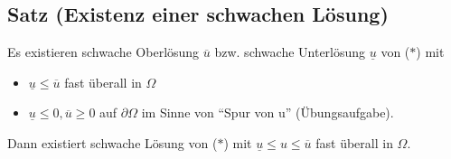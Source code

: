 \subsection{Satz (Existenz einer schwachen Lösung)}

Es existieren schwache Oberlösung $\overline u$ bzw. schwache Unterlösung $\underline u$ von ($\ast$) mit
\begin{itemize}
  \item $\underline u \leq \overline u$ fast überall in $\Omega$
  \item $\underline u \leq 0, \overline u \geq 0$ auf $\partial \Omega$ im Sinne von ``Spur von u'' (Übungsaufgabe).
\end{itemize}

Dann existiert schwache Lösung von ($\ast$) mit $\underline u \leq u \leq \overline u$ fast überall in $\Omega$.

